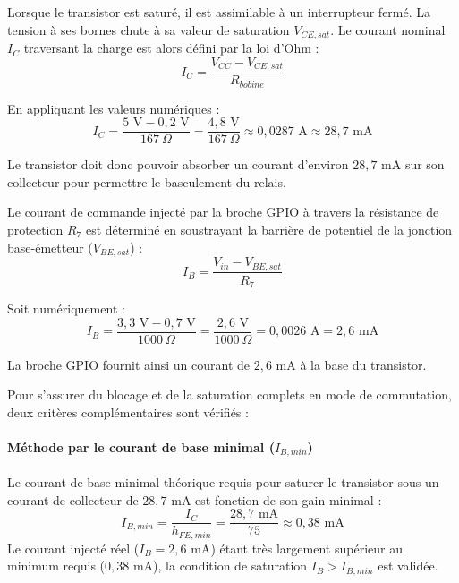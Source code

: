 Lorsque le transistor est saturé, il est assimilable à un interrupteur fermé. La tension à ses bornes chute à sa 
valeur de saturation $V_{CE,sat}$. Le courant nominal $I_C$ traversant la charge est alors défini par la loi d'Ohm :
\begin{equation}
    I_C = \frac{V_{CC} - V_{CE,sat}}{R_{bobine}}
\end{equation}

En appliquant les valeurs numériques :
\begin{equation}
    I_C = \frac{5\text{ V} - 0{,}2\text{ V}}{167\ \Omega} = \frac{4{,}8\text{ V}}{167\ \Omega} \approx 0{,}0287\text{ A} \approx 28{,}7\text{ mA}
\end{equation}

Le transistor doit donc pouvoir absorber un courant d'environ $28{,}7\text{ mA}$ sur son collecteur pour
permettre le basculement du relais.

\bigskip

Le courant de commande injecté par la broche GPIO à travers la résistance de protection $R_7$ est déterminé 
en soustrayant la barrière de potentiel de la jonction base-émetteur ($V_{BE,sat}$) :
\begin{equation}
    I_B = \frac{V_{in} - V_{BE,sat}}{R_7}
\end{equation}

Soit numériquement :
\begin{equation}
    I_B = \frac{3{,}3\text{ V} - 0{,}7\text{ V}}{1000\ \Omega} = \frac{2{,}6\text{ V}}{1000\ \Omega} = 0{,}0026\text{ A} = 2{,}6\text{ mA}
\end{equation}

La broche GPIO fournit ainsi un courant de $2{,}6\text{ mA}$ à la base du transistor.

\bigskip
Pour s'assurer du blocage et de la saturation complets en mode de commutation, deux critères complémentaires sont vérifiés :

\paragraph{Méthode par le courant de base minimal ($I_{B,min}$)} 
Le courant de base minimal théorique requis pour saturer le transistor sous un courant de collecteur de $28{,}7\text{ mA}$ 
est fonction de son gain minimal :
\begin{equation}
    I_{B,min} = \frac{I_C}{h_{FE,min}} = \frac{28{,}7\text{ mA}}{75} \approx 0{,}38\text{ mA}
\end{equation}
Le courant injecté réel ($I_B = 2{,}6\text{ mA}$) étant très largement supérieur au minimum requis ($0{,}38\text{ mA}$), 
la condition de saturation $I_B > I_{B,min}$ est validée.


